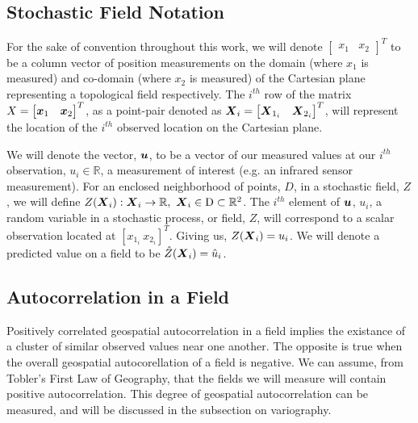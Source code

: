 \documentclass[11pt]{ucthesis}
\newcommand{\vect}[1]{{\it{\boldsymbol{#1}}}}
\begin{document}
\subsection{Stochastic Field Notation}
For the sake of convention throughout this work, we will denote $\begin{bmatrix} x_1 & x_2 \end{bmatrix}^{T}$ to be a column vector of position measurements on the domain (where $x_1$ is measured) and co-domain (where $x_2$ is measured) of the Cartesian plane representing a topological field respectively. The $i^{th}$ row of the matrix $X = \begin{bmatrix} \vect{x}_1 & \vect{x}_2 \end{bmatrix}^{T}$, as a point-pair denoted as $\vect{X}_i = \begin{bmatrix} \vect{X}_{1_i} & \vect{X}_{2_i} \end{bmatrix}^{T}$, will represent the location of the $i^{th}$ observed location on the Cartesian plane.

We will denote the vector, $\vect{u}$, to be a vector of our measured values at our $i^{th}$ observation, $u_i \in \mathbb{R}$, a measurement of interest (e.g. an infrared sensor measurement). For an enclosed neighborhood of points, $D$, in a stochastic field, $Z$, we will define $Z(\vect{X}_i): \vect{X}_i \rightarrow \mathbb{R},\ \vect{X}_i \in \rm{D} \subset \mathbb{R}^2$. The $i^{th}$ element of $\vect{u}$, $u_i$, a random variable in a stochastic process, or field, $Z$, will correspond to a scalar observation located at $[x_{1_i}\ x_{2_i}]^{T}$. Giving us, $Z(\vect{X}_i)=u_i$. We will denote a predicted value on a field to be $\hat{Z}(\vect{X}_i)=\hat{u}_i$.

\subsection{Autocorrelation in a Field}
Positively correlated geospatial autocorrelation in a field implies the existance of a cluster of similar observed values near one another. The opposite is true when the overall geospatial autocorellation of a field is negative. We can assume, from Tobler's First Law of Geography, that the fields we will measure will contain positive autocorrelation. This degree of geospatial autocorrelation can be measured, and will be discussed in the subsection on variography.
\end{document}
